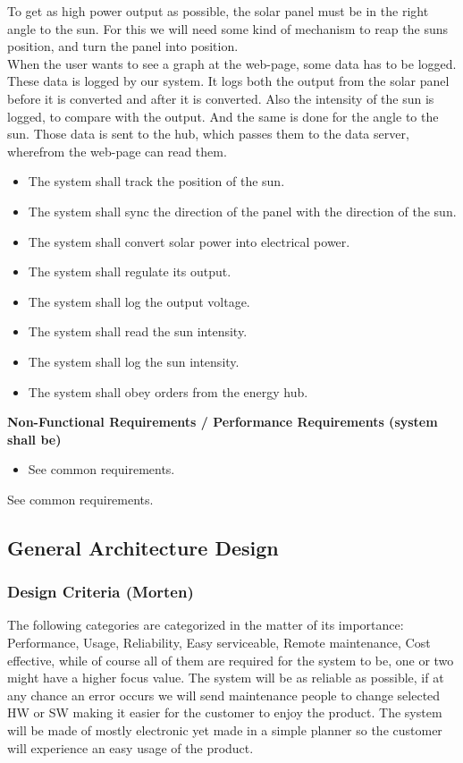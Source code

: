 \documentclass[12pt,a4paper]{report}
\begin{document}
To get as high power output as possible, the solar panel must be in the right angle to the sun. For this we will need some kind of mechanism to reap the suns position, and turn the panel into position.\\

When the user wants to see a graph at the web-page, some data has to be logged. These data is logged by our system. It logs both the output from the solar panel before it is converted and after it is converted. Also the intensity of the sun is logged, to compare with the output. And the same is done for the angle to the sun. Those data is sent to the hub, which passes them to the data server, wherefrom the web-page can read them.\\


\begin{itemize}
\item The system shall track the position of the sun.
\item The system shall sync the direction of the panel with the direction of the sun.
\item The system shall convert solar power into electrical power.
\item The system shall regulate its output.
\item The system shall log the output voltage.
\item The system shall read the sun intensity.
\item The system shall log the sun intensity.
\item The system shall obey orders from the energy hub.
\end{itemize}

\textbf{Non-Functional Requirements / Performance Requirements (system shall be)}
\begin{itemize}
\item See common requirements.
\end{itemize}

See common requirements.

\subsection{General Architecture Design}
\subsubsection{Design Criteria (Morten)}
The following categories are categorized in the matter of its importance: Performance, Usage, Reliability, Easy serviceable, Remote maintenance, Cost effective, while of course all of them are required for the system to be, one or two might have a higher focus value. The system will be as reliable as possible, if at any chance an error occurs we will send maintenance people to change selected HW or SW making it easier for the customer to enjoy the product. The system will be made of mostly electronic yet made in a simple planner so the customer will experience an easy usage of the product.\\
\end{document}
